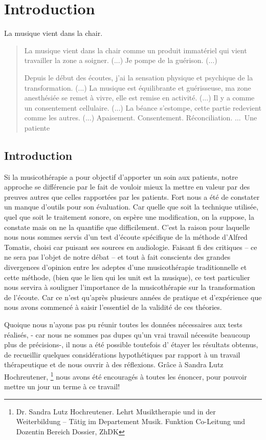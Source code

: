 \chapter{Introduction}

La musique vient dans la chair.

\begin{quotation}
 La musique vient dans la chair comme un produit immatériel
 qui vient travailler la zone a soigner. (...)      Je pompe de la
 guérison. (...)

 Depuis le début des écoutes, j'ai la sensation physique et
 psychique de la
 transformation. (...)  La musique est équilibrante et guérisseuse, ma zone
 anesthésiée se remet à vivre, elle est remise en activité. (...)
 Il y a comme un consentement cellulaire. (...)
La béance s'estompe, cette
partie redevient comme les autres. (...)
Apaisement. Consentement. Réconciliation.    
$\ldots$\  Une patiente\autocite{propos d'une patiente}
\end{quotation}



\section{ Introduction}

Si la musicothérapie a pour objectif d'apporter un soin aux patients, notre  approche se différencie par le fait de
vouloir mieux la mettre en valeur par des preuves
autres que celles rapportées par les patients. Fort nous a été de
constater un manque d'outils pour son évaluation. Car quelle que soit la technique utilisée, quel que soit
le traitement sonore, on espère une modification, on la suppose, la constate
 mais
 on ne la quantifie que difficilement. C'est la raison pour laquelle
 nous nous sommes servis d'un test d'écoute
 spécifique de la méthode d'Alfred Tomatis, choisi car puisant ses
 sources en audiologie. Faisant fi des critiques --
 ce ne sera pas l'objet de notre débat -- et  tout à fait conscients des
 grandes divergences d'opinion entre les adeptes d'une musicothérapie
 traditionnelle et cette méthode, (bien que le lien qui les unit est la musique), ce test particulier  nous servira à
 souligner l'importance de la musicothérapie 
 sur la transformation de l'écoute.
 Car ce n'est qu'après plusieurs
années de pratique et d'expérience que nous avons commencé à saisir
l'essentiel de la validité de ces théories.

Quoique nous n'ayons pas pu réunir toutes les données nécessaires
aux tests réalisés, - car nous ne sommes pas dupes qu'un vrai travail
nécessite beaucoup plus de précisions-, il nous a été possible toutefois d' étayer
les résultats obtenus, de recueillir quelques considérations hypothétiques par rapport à un
travail thérapeutique et de nous ouvrir à des réflexions. 
Grâce à Sandra Lutz Hochreutener,  \footnote{Dr. Sandra Lutz
  Hochreutener. Lehrt Musiktherapie und in der Weiterbildung – Tätig
  im Departement Musik. Funktion Co-Leitung und Dozentin Bereich
  Dossier, ZhDK}
 nous avons été encouragés à toutes les énoncer, pour pouvoir mettre un jour un terme à ce travail!


